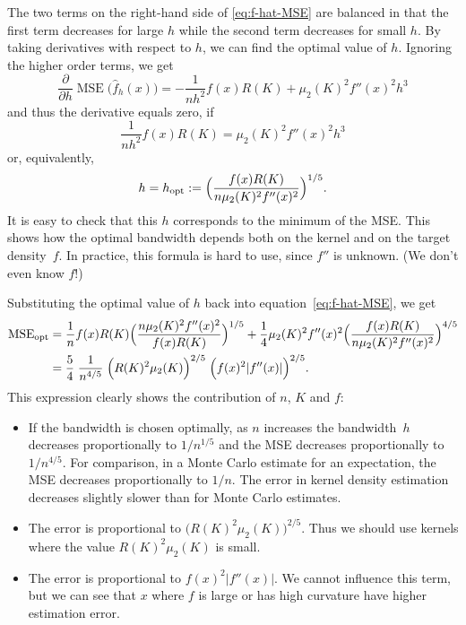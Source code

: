 \documentclass[
  a4paper,
]{article}
\theoremstyle{definition}
\theoremstyle{definition}
\theoremstyle{definition}
\theoremstyle{definition}
\theoremstyle{remark}
\begin{document}
The two terms on the right-hand side of \eqref{eq:f-hat-MSE} are balanced in
that the first term decreases for large \(h\) while the second term decreases for
small \(h\). By taking derivatives with respect to \(h\), we can
find the optimal value of \(h\). Ignoring the higher order terms, we get
\begin{equation*}
  \frac{\partial}{\partial h} \mathop{\mathrm{MSE}}\nolimits\bigl( \hat f_h(x) \bigr)
  = -\frac{1}{nh^2} f(x) R(K) + \mu_2(K)^2 f''(x)^2 h^3
\end{equation*}
and thus the derivative equals zero, if
\begin{equation*}
  \frac{1}{nh^2} f(x) R(K) = \mu_2(K)^2 f''(x)^2 h^3
\end{equation*}
or, equivalently,
\begin{equation*}
  h
  = h_\mathrm{opt}
  := \Bigl( \frac{f(x) R(K)}{n \mu_2(K)^2 f''(x)^2} \Bigr)^{1/5}.
\end{equation*}
It is easy to check that this \(h\) corresponds to the minimum of the MSE.
This shows how the optimal bandwidth depends both on the kernel and on
the target density~\(f\). In practice, this formula is hard to use,
since \(f''\) is unknown. (We don't even know \(f\)!)

Substituting the optimal value of \(h\) back into equation~\eqref{eq:f-hat-MSE},
we get
\begin{align*}
  \mathop{\mathrm{MSE}}\nolimits_\mathrm{opt}
  &= \frac{1}{n} f(x) R(K) \Bigl( \frac{n \mu_2(K)^2 f''(x)^2}{f(x) R(K)} \Bigr)^{1/5}
     + \frac14 \mu_2(K)^2 f''(x)^2 \Bigl( \frac{f(x) R(K)}{n \mu_2(K)^2 f''(x)^2} \Bigr)^{4/5} \\
  &= \frac54 \; \frac{1}{n^{4/5}}
      \; \Bigl( R(K)^2 \mu_2(K) \Bigr)^{2/5}
      \; \Bigl( f(x)^2 |f''(x)| \Bigr)^{2/5}.
\end{align*}
This expression clearly shows the contribution of \(n\), \(K\) and \(f\):

\begin{itemize}
\item
  If the bandwidth is chosen optimally, as \(n\) increases the bandwidth~\(h\)
  decreases proportionally to \(1/n^{1/5}\) and the MSE decreases
  proportionally to \(1 / n^{4/5}\). For comparison, in a Monte Carlo
  estimate for an expectation, the MSE decreases proportionally to \(1/n\).
  The error in kernel density estimation decreases slightly slower than
  for Monte Carlo estimates.
\item
  The error is proportional to \(\bigl( R(K)^2 \mu_2(K) \bigr)^{2/5}\).
  Thus we should use kernels where the value \(R(K)^2 \mu_2(K)\)
  is small.
\item
  The error is proportional to \(f(x)^2 |f''(x)|\). We cannot influence
  this term, but we can see that \(x\) where \(f\) is large or has
  high curvature have higher estimation error.
\end{itemize}
\end{document}
